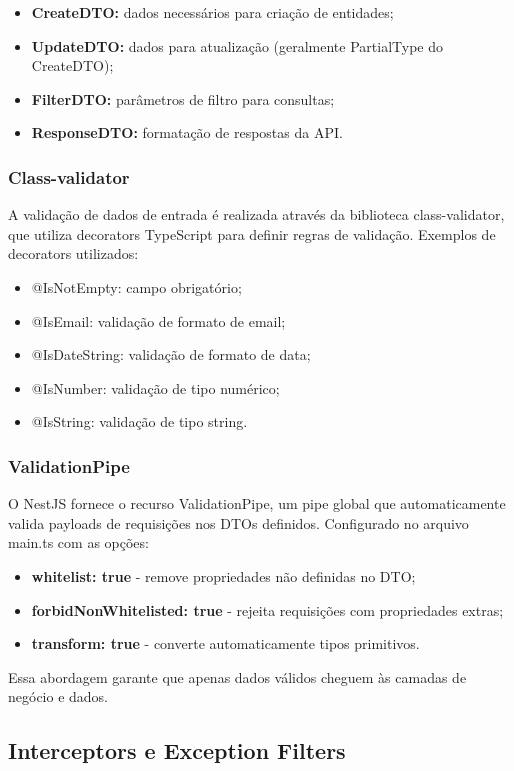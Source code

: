 \begin{itemize}
    \item \textbf{CreateDTO:} dados necessários para criação de entidades;
    \item \textbf{UpdateDTO:} dados para atualização (geralmente PartialType do CreateDTO);
    \item \textbf{FilterDTO:} parâmetros de filtro para consultas;
    \item \textbf{ResponseDTO:} formatação de respostas da API.
\end{itemize}

\subsubsection{Class-validator}
A validação de dados de entrada é realizada através da biblioteca class-validator, que utiliza decorators TypeScript para definir regras de validação. Exemplos de decorators utilizados:
\begin{itemize}
    \item @IsNotEmpty: campo obrigatório;
    \item @IsEmail: validação de formato de email;
    \item @IsDateString: validação de formato de data;
    \item @IsNumber: validação de tipo numérico;
    \item @IsString: validação de tipo string.
\end{itemize}
\subsubsection{ValidationPipe}
O NestJS fornece o recurso ValidationPipe, um pipe global que automaticamente valida payloads de requisições nos DTOs definidos. Configurado no arquivo main.ts com as opções:

\begin{itemize}
    \item \textbf{whitelist: true} - remove propriedades não definidas no DTO;
    \item \textbf{forbidNonWhitelisted: true} - rejeita requisições com propriedades extras;
    \item \textbf{transform: true} - converte automaticamente tipos primitivos.
\end{itemize}
Essa abordagem garante que apenas dados válidos cheguem às camadas de negócio e dados.
\subsection{Interceptors e Exception Filters}


